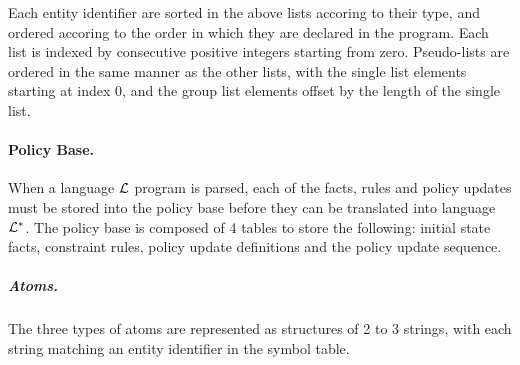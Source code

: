 \documentclass[10pt, twocolumn]{article}
\begin{document}
          Each entity identifier are sorted in the above lists accoring to
          their type, and ordered accoring to the order in which they are
          declared in the program. Each list is indexed by consecutive
          positive integers starting from zero. Pseudo-lists are ordered in
          the same manner as the other lists, with the single list elements
          starting at index 0, and the group list elements offset by the
          length of the single list.

        \paragraph{Policy Base.}

          When a language ${\cal L}$ program is parsed, each of the facts,
          rules and policy updates must be stored into the policy base before
          they can be translated into language $\cal L^{*}$. The policy base is
          composed of 4 tables to store the following: initial state facts,
          constraint rules, policy update definitions and the policy update
          sequence.

          \subparagraph{Atoms.}

            The three types of atoms are represented as structures of 2 to 3
            strings, with each string matching an entity identifier in the
            symbol table.
\end{document}
